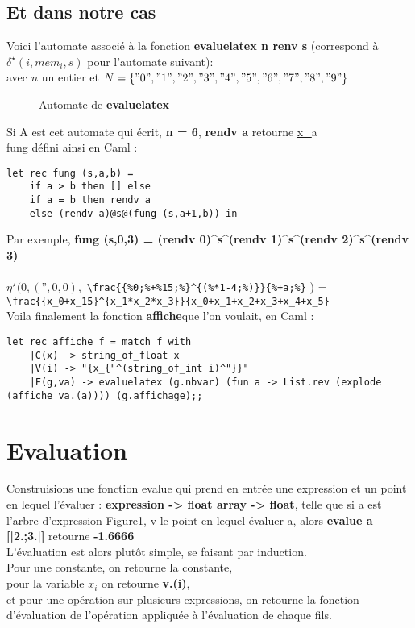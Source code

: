 \documentclass{article}
\theoremstyle{definition}
\newcommand*{\unefiguretikz}[2]{\begin{figure}[!h] \centering  \caption{#2} \end{figure}}
\newcommand*{\unefiguretikzsimple}[1]{\begin{figure}[!h] \centering \end{figure}}
\begin{document}
\unefiguretikzsimple{lareprstand}

\subsection{Et dans notre cas}
Voici l'automate associ\'e \`a la fonction \textbf{evaluelatex n renv s} (correspond \`a $\delta^\star(i,mem_i,s)$ pour l'automate suivant):\\
avec $n$ un entier et $N = \{"0","1","2","3","4","5","6","7","8","9"\}$\\

\unefiguretikz{lautomate}{Automate de \textbf{evaluelatex}}

Si A est cet automate qui écrit, \textbf{n = 6}, \textbf{rendv a} retourne \underline{x\_}a\\
fung d\'efini ainsi en Caml : 
\begin{lstlisting}
let rec fung (s,a,b) = 
    if a > b then [] else
    if a = b then rendv a 
    else (rendv a)@s@(fung (s,a+1,b)) in    
\end{lstlisting}
Par exemple, \textbf{fung (s,0,3) = (rendv  0)\^{}s\^{}(rendv 1)\^{}s\^{}(rendv 2)\^{}s\^{}(rendv 3)}\\\\
$\eta^\star (0,(\text{''},0,0),$ 
\verb|\frac{{%|\textbar\verb|0;%+%|\textbar\verb|15;%}^{(%*|\textbar\verb|1-4;%)}}{%+|\textbar\verb|a;%}| ) =\\
\verb|\frac{{x_0+x_15}^{x_1*x_2*x_3}}{x_0+x_1+x_2+x_3+x_4+x_5}|\\

Voila finalement la fonction \textbf{affiche}que l'on voulait, en Caml :
\begin{lstlisting}
let rec affiche f = match f with
    |C(x) -> string_of_float x
    |V(i) -> "{x_{"^(string_of_int i)^"}}"
    |F(g,va) -> evaluelatex (g.nbvar) (fun a -> List.rev (explode (affiche va.(a)))) (g.affichage);;
\end{lstlisting}

\section{Evaluation}
Construisions une fonction evalue qui prend en entr\'ee une expression et un point en lequel l'\'evaluer : \textbf{expression -> float array -> float}, telle que si a est l'arbre d'expression Figure1, v le point en lequel \'evaluer a, alors \textbf{evalue a [|2.;3.|]} retourne \textbf{-1.6666}\\
L'\'evaluation est alors plut\^ot simple, se faisant par induction.\\
Pour une constante, on retourne la constante,\\
pour la variable $x_i$ on retourne \textbf{v.(i)},\\
et pour une op\'eration sur plusieurs expressions, on retourne la fonction d'\'evaluation de l'op\'eration appliqu\'ee \`a l'\'evaluation de chaque fils.\\
\end{document}

